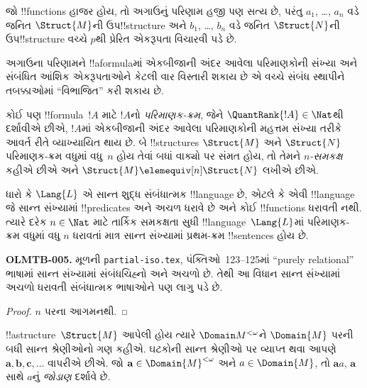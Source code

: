 \documentclass[../../../include/open-logic-section]{subfiles}
\begin{document}
\begin{rem}
જો !!{function}s હાજર હોય, તો અગાઉનું પરિણામ હજી પણ સત્ય છે, પરંતુ
$a_1$, \dots, $a_n$ વડે જનિત $\Struct{M}$ની ઉપ!!{structure} અને
$b_1$, \dots, $b_n$ વડે જનિત $\Struct{N}$ની ઉપ!!{structure} વચ્ચે
$p$થી પ્રેરિત એકરૂપતા વિચારવી પડે છે.
\end{rem}

અગાઉના પરિણામને !!a{formula}માં એકબીજાની અંદર આવેલા પરિમાણકોની સંખ્યા
અને સંબંધિત આંશિક એકરૂપતાઓને કેટલી વાર વિસ્તારી શકાય છે એ વચ્ચે સંબંધ
સ્થાપીને તબક્કાઓમાં ``વિભાજિત'' કરી શકાય છે.

\begin{defn}
  કોઈ પણ !!{formula}~$!A$ માટે $!A$નો \emph{પરિમાણક-ક્રમ}, જેને
  $\QuantRank{!A} \in \Nat$થી દર્શાવીએ છીએ, $!A$માં એકબીજાની અંદર
  આવેલા પરિમાણકોની મહત્તમ સંખ્યા તરીકે આવર્ત રીતે વ્યાખ્યાયિત થાય છે.
  બે !!{structure}s $\Struct{M}$ અને $\Struct{N}$ પરિમાણક-ક્રમ વધુમાં
  વધુ~$n$ હોય તેવાં બધાં વાક્યો પર સંમત હોય, તો તેમને
  \emph{$n$-સમકક્ષ} કહીએ છીએ અને $\Struct{M} \elemequiv[n]
  \Struct{N}$ લખીએ છીએ.
\end{defn}

\begin{prop}
  ધારો કે $\Lang{L}$ એ સાન્ત શુદ્ધ સંબંધાત્મક !!{language} છે, એટલે કે
  એવી !!{language} જે સાન્ત સંખ્યામાં !!{predicate}s અને અચળ ધરાવે છે અને કોઈ
  !!{function}s ધરાવતી નથી. ત્યારે દરેક $n \in \Nat$ માટે તાર્કિક સમકક્ષતા
  સુધી !!{language}~$\Lang{L}$માં પરિમાણક-ક્રમ વધુમાં વધુ $n$ ધરાવતાં માત્ર સાન્ત
  સંખ્યામાં પ્રથમ-ક્રમ !!{sentence}s હોય છે.
  \begin{editorial}
\textbf{OLMTB-005.} મૂળની \texttt{partial-iso.tex}, પંક્તિઓ~123--125માં “purely relational” ભાષામાં સાન્ત સંખ્યામાં સંબંધચિહ્નો અને અચળો છે. તેથી આ વિધાન સાન્ત સંખ્યામાં અચળો ધરાવતી સંબંધાત્મક ભાષાઓને પણ લાગુ પડે છે.
\end{editorial}
\end{prop}

\begin{proof}
  $n$ પરના આગમનથી.
\end{proof}

\begin{defn}
  !!a{structure}~$\Struct{M}$ આપેલી હોય ત્યારે $\Domain M^{<\omega}$ને
  $\Domain{M}$ પરની બધી સાન્ત શ્રેણીઓનો ગણ કહીએ. ઘટકોની સાન્ત
  શ્રેણીઓ પર વ્યાપ્ત થવા આપણે $\mathbf{a}, \mathbf{b}, \mathbf{c},
  \ldots$ વાપરીએ છીએ. જો $\mathbf{a} \in \Domain{M}^{<\omega}$ અને
  $a \in \Domain{M}$, તો $\mathbf{a}a$, $\mathbf{a}$ સાથે $a$નું
  \emph{જોડાણ} દર્શાવે છે.
\end{defn}
\end{document}
